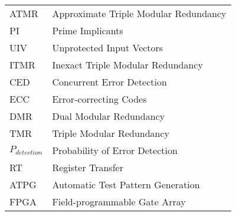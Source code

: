 \begin{table}[h!]
    \captionsetup{labelformat=empty}
    \begin{tabular}{ll} %
      ATMR				&			Approximate Triple Modular Redundancy \\
			PI				&				Prime Implicants\\
			UIV			&				Unprotected Input Vectors\\
			ITMR			&				Inexact Triple Modular Redundancy \\
			
			
       CED				&			Concurrent Error Detection\\
       ECC 				& 			Error-correcting Codes\\
      DMR		 		& 			Dual Modular Redundancy\\
      TMR		 		& 			Triple Modular Redundancy\\
$P_{detection}$	& 			Probability of Error Detection\\
      RT		 			& 			Register Transfer\\
      ATPG				& 			Automatic Test Pattern Generation\\
      FPGA				 & 			Field-programmable Gate Array\\

    \end{tabular}
\end{table}
